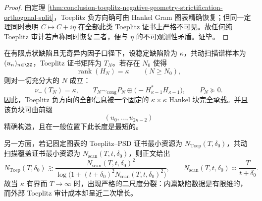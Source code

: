 \begin{proof}
由定理 \ref{thm:conclusion-toeplitz-negative-geometry-strictification-orthogonal-split}，Toeplitz 负方向确可由 Hankel Gram 图表精确恢复；但同一定理同时表明 \(C\mapsto C+i\eta\) 在全部此类 Toeplitz 证书上严格不可见。故任何纯 Toeplitz 审计若声称同时恢复二者，便与 \(\eta\) 的不可观测性矛盾。证毕。
\end{proof}

\begin{theorem}\label{thm:conclusion-finite-defect-rank-vs-macroscopic-toeplitz-audit-scale-splitting}
在有限点状缺陷且无奇异内因子口径下，设稳定缺陷阶为 \(\kappa\)，共动扫描谱样本为 \((u_n)_{n\in\ZZ}\)，Toeplitz 证书矩阵为 \(T_N\)。若存在 \(N_0\) 使得
\[
\operatorname{rank}(H_N)=\kappa
\qquad (N\ge N_0),
\]
则对一切充分大的 \(N\) 成立：
\[
\nu_-(T_N)=\kappa,
\qquad
T_N \sim_{\mathrm{cong}} P_N\oplus\bigl(-H_{\kappa-1}^\ast H_{\kappa-1}\bigr),
\qquad
P_N\succeq 0.
\]
因此，Toeplitz 负方向的全部信息被一个固定的 \(\kappa\times\kappa\) Hankel 块完全承载。并且该负块可由前缀
\[
(u_0,\dots,u_{2\kappa-2})
\]
精确构造，且在一般位置下此长度是最短的。

另一方面，若记固定图表的 Toeplitz--PSD 证书最小资源为 \(N_{\mathrm{Toep}}(T,\delta_0)\)，共动扫描覆盖证书最小资源为 \(N_{\mathrm{scan}}(T,t,\delta_0)\)，则正文给出
\[
N_{\mathrm{Toep}}(T,\delta_0)\gtrsim
\frac{N_{\mathrm{scan}}(T,t,\delta_0)^2}
{\log\!\bigl(1+(t+\delta_0)^2N_{\mathrm{scan}}(T,t,\delta_0)^2\bigr)},
\qquad
N_{\mathrm{scan}}(T,t,\delta_0)\asymp \frac{T}{t+\delta_0}.
\]
故当 \(\kappa\) 有界而 \(T\to\infty\) 时，出现严格的二尺度分裂：内禀缺陷数据是有限维的，而外部 Toeplitz 审计成本却呈近二次增长。
\end{theorem}


